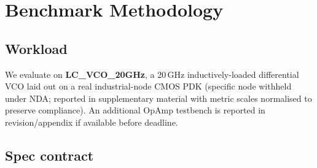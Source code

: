
\section{Benchmark Methodology}
\label{sec:methodology}

\subsection{Workload}
\label{sec:method-workload}

We evaluate on \textbf{LC\_VCO\_20GHz}, a 20\,GHz inductively-loaded
differential VCO laid out on a real industrial-node CMOS PDK
(specific node withheld under NDA; reported in supplementary
material with metric scales normalised to preserve compliance).
An additional OpAmp testbench is reported in revision/appendix if
available before deadline.

\subsection{Spec contract}
\label{sec:method-spec}

